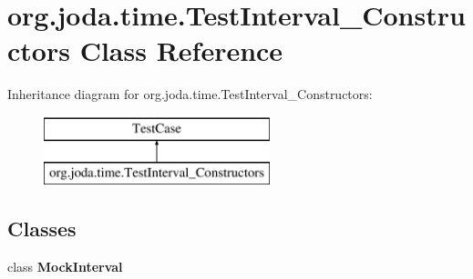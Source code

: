 \hypertarget{classorg_1_1joda_1_1time_1_1_test_interval___constructors}{\section{org.\-joda.\-time.\-Test\-Interval\-\_\-\-Constructors Class Reference}
\label{classorg_1_1joda_1_1time_1_1_test_interval___constructors}
}
Inheritance diagram for org.\-joda.\-time.\-Test\-Interval\-\_\-\-Constructors\-:\begin{figure}[H]
\begin{center}
\leavevmode
\includegraphics[height=2.000000cm]{classorg_1_1joda_1_1time_1_1_test_interval___constructors}
\end{center}
\end{figure}
\subsection*{Classes}
\begin{DoxyCompactItemize}
\item 
class {\bfseries Mock\-Interval}
\end{DoxyCompactItemize}
